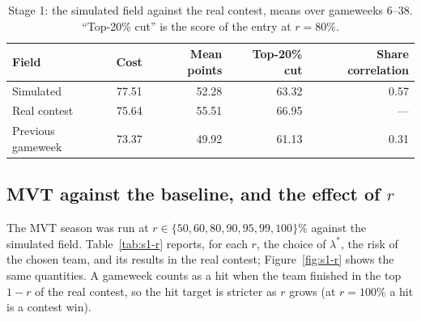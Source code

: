 \documentclass[12pt,oneside,a4paper]{book}
\theoremstyle{definition}
\theoremstyle{remark}
\begin{document}
	\begin{table}[ht]
		\centering
		\caption{Stage 1: the simulated field against the real contest, means over gameweeks 6--38.
			``Top-20\% cut'' is the score of the entry at $r=80\%$.}
		\label{tab:s1-field}
		\begin{tabular}{lrrrr}
			\toprule
			Field & Cost & Mean points & Top-20\% cut & Share correlation \\
			\midrule
			Simulated           & 77.51 & 52.28 & 63.32 & 0.57 \\
			Real contest        & 75.64 & 55.51 & 66.95 & --- \\
			Previous gameweek   & 73.37 & 49.92 & 61.13 & 0.31 \\
			\bottomrule
		\end{tabular}
	\end{table}

	\subsection{MVT against the baseline, and the effect of $r$}
	\label{sec:s1-results}

	The MVT season was run at $r\in\{50,60,80,90,95,99,100\}\%$ against the simulated field.
	Table~\ref{tab:s1-r} reports, for each $r$, the choice of $\lambda^*$, the risk of the chosen
	team, and its results in the real contest; Figure~\ref{fig:s1-r} shows the same quantities.
	A gameweek counts as a hit when the team finished in the top $1-r$ of the real contest, so the
	hit target is stricter as $r$ grows (at $r=100\%$ a hit is a contest win).
\end{document}
